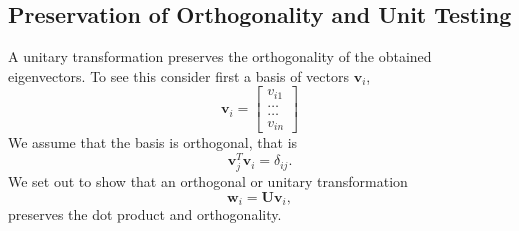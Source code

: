 \documentclass{article}
\begin{document}
\subsection{Preservation of Orthogonality and Unit Testing}
A unitary transformation preserves  the orthogonality of the obtained eigenvectors. To see this consider first a basis of vectors $\mathbf{v}_i$,
\[
\mathbf{v}_i = \begin{bmatrix} v_{i1} \\ \dots \\ \dots \\v_{in} \end{bmatrix}
\]
We assume that the basis is orthogonal, that is 
\[
\mathbf{v}_j^T\mathbf{v}_i = \delta_{ij}.
\]
We set out to show that an orthogonal or unitary transformation
\[
\mathbf{w}_i=\mathbf{U}\mathbf{v}_i,
\]
preserves the dot product and orthogonality.
\end{document}
